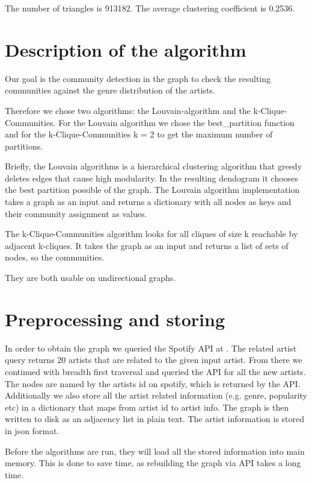 \documentclass[11pt,a4paper,onecolumn,notitlepage]{article}
\begin{document}
The number of triangles is 913182. The average clustering coefficient is 0.2536.

\section{Description of the algorithm}

Our goal is the community detection in the graph to check the resulting communities against the genre distribution of the artists.

Therefore we chose two algorithms: the Louvain-algorithm\cite{louvain} and the k-Clique-Communities\cite{kclique}. For the Louvain algorithm we chose the best_partition function and for the k-Clique-Communities k = 2 to get the maximum number of partitions.

Briefly, the Louvain algorithms is a hierarchical clustering algorithm that greedy deletes edges that cause high modularity. In the resulting dendogram it chooses the best partition possible of the graph. The Louvain algorithm implementation takes a graph as an input and returns a dictionary with all nodes as keys and their community assignment as values. 

The k-Clique-Communities algorithm looks for all cliques of size k reachable by adjacent k-cliques. It takes the graph as an input and returns a list of sets of nodes, so the communities.

They are both usable on undirectional graphs.

\section{Preprocessing and storing}

In order to obtain the graph we queried the Spotify API at \cite{spotifyapi}. The related artist query returns 20 artists that are related to the given input artist.
From there we continued with breadth first traversal and queried the API for all the new artists.
The nodes are named by the artists id on spotify, which is returned by the API.
Additionally we also store all the artist related information (e.g. genre, popularity etc) in a dictionary that maps from artist id to artist info.
The graph is then written to disk as an adjacency list in plain text. The artist information is stored in json format.

Before the algorithms are run, they will load all the stored information into main memory. This is done to save time, as rebuilding the graph via API takes a long time.
\end{document}
